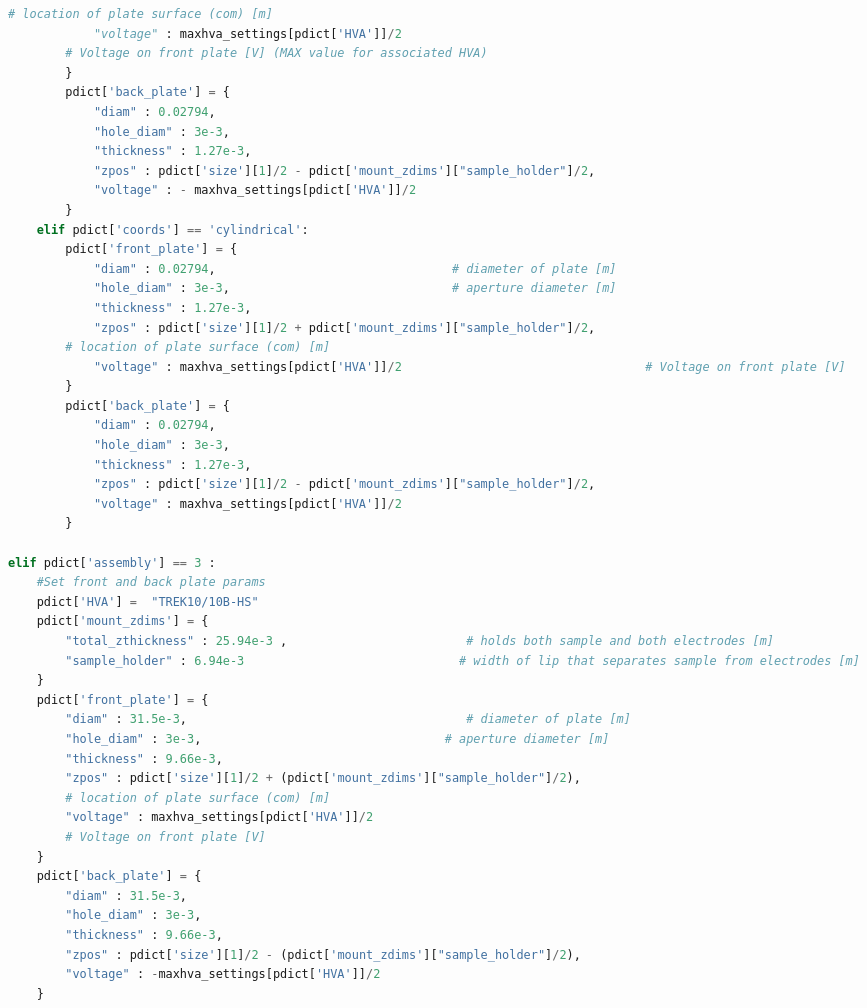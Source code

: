 \begin{spacing}{1.2}
\begin{lstlisting}[frame=single, language=Python]
		# location of plate surface (com) [m]
            "voltage" : maxhva_settings[pdict['HVA']]/2
		# Voltage on front plate [V] (MAX value for associated HVA)
        }
        pdict['back_plate'] = {
            "diam" : 0.02794,
            "hole_diam" : 3e-3,
            "thickness" : 1.27e-3, 
            "zpos" : pdict['size'][1]/2 - pdict['mount_zdims']["sample_holder"]/2,
            "voltage" : - maxhva_settings[pdict['HVA']]/2
        }
    elif pdict['coords'] == 'cylindrical':
        pdict['front_plate'] = {
            "diam" : 0.02794,                                 # diameter of plate [m]
            "hole_diam" : 3e-3,                               # aperture diameter [m]
            "thickness" : 1.27e-3, 
            "zpos" : pdict['size'][1]/2 + pdict['mount_zdims']["sample_holder"]/2,    
		# location of plate surface (com) [m]
            "voltage" : maxhva_settings[pdict['HVA']]/2                                  # Voltage on front plate [V]
        }
        pdict['back_plate'] = {
            "diam" : 0.02794,
            "hole_diam" : 3e-3,
            "thickness" : 1.27e-3, 
            "zpos" : pdict['size'][1]/2 - pdict['mount_zdims']["sample_holder"]/2,
            "voltage" : maxhva_settings[pdict['HVA']]/2  
        }
        
elif pdict['assembly'] == 3 :
    #Set front and back plate params
    pdict['HVA'] =  "TREK10/10B-HS"
    pdict['mount_zdims'] = {
        "total_zthickness" : 25.94e-3 ,                         # holds both sample and both electrodes [m]
        "sample_holder" : 6.94e-3                              # width of lip that separates sample from electrodes [m] 
    }
    pdict['front_plate'] = {
        "diam" : 31.5e-3,                                       # diameter of plate [m]
        "hole_diam" : 3e-3,                                  # aperture diameter [m]
        "thickness" : 9.66e-3, 
        "zpos" : pdict['size'][1]/2 + (pdict['mount_zdims']["sample_holder"]/2),      
	    # location of plate surface (com) [m]
        "voltage" : maxhva_settings[pdict['HVA']]/2                                     
	    # Voltage on front plate [V]
    }
    pdict['back_plate'] = {
        "diam" : 31.5e-3,
        "hole_diam" : 3e-3,
        "thickness" : 9.66e-3, 
        "zpos" : pdict['size'][1]/2 - (pdict['mount_zdims']["sample_holder"]/2),
        "voltage" : -maxhva_settings[pdict['HVA']]/2
    }
    

\end{lstlisting}
\end{spacing}
